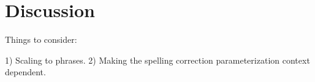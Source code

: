 \section{Discussion}
\label{section_discussion}

Things to consider: 

1) Scaling to phrases.
2) Making the spelling correction parameterization context dependent.
